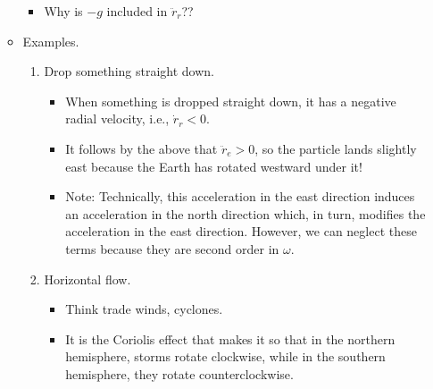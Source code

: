 \documentclass[../notes.tex]{subfiles}
\begin{document}
\begin{itemize}
\begin{itemize}
\begin{itemize}
            \item Why is $-g$ included in $\ddot{r}_r$??
        \end{itemize}
        \item Examples.
        \begin{enumerate}
            \item Drop something straight down.
            \begin{itemize}
                \item When something is dropped straight down, it has a negative radial velocity, i.e., $\dot{r}_r<0$.
                \item It follows by the above that $\ddot{r}_e>0$, so the particle lands slightly east because the Earth has rotated westward under it!
                \item Note: Technically, this acceleration in the east direction induces an acceleration in the north direction which, in turn, modifies the acceleration in the east direction. However, we can neglect these terms because they are second order in $\omega$.
            \end{itemize}
            \item Horizontal flow.
            \begin{itemize}
                \item Think trade winds, cyclones.
                \item It is the Coriolis effect that makes it so that in the northern hemisphere, storms rotate clockwise, while in the southern hemisphere, they rotate counterclockwise.
            \end{itemize}
        \end{enumerate}
    \end{itemize}
\end{itemize}
\end{document}
